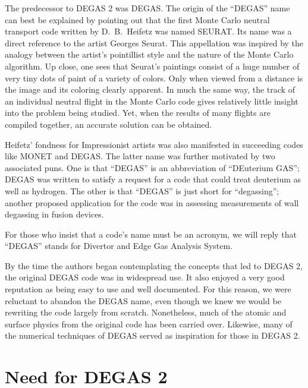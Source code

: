 \documentclass[12pt]{report}
\begin{document}
The predecessor to DEGAS 2 was  DEGAS\cite{Heif82}. The origin of the
``DEGAS'' name can best be explained by pointing out that the first
Monte Carlo neutral transport code written by D.\ B.\ Heifetz was
named SEURAT. Its name was a direct reference to the artist Georges
Seurat. This appellation was inspired by the analogy between the
artist's pointillist style and the nature of the Monte Carlo algorithm.
Up close, one sees that Seurat's paintings consist of a huge number of very
tiny dots of paint of a variety of colors.  Only when viewed from a distance
is the image and its coloring clearly apparent. In much the same way,
the track of an individual neutral flight in the Monte Carlo code
gives relatively little insight into the problem being studied. Yet, when the
results of many flights are compiled together, an accurate solution can
be obtained.

Heifetz' fondness for Impressionist artists was also manifested
in succeeding codes like MONET and DEGAS. The latter name was further
motivated by two associated puns. One is that ``DEGAS'' is an
abbreviation of ``DEuterium GAS''; DEGAS was written to satisfy a
request for a code that could treat deuterium as well as hydrogen.
The other is that ``DEGAS'' is just short for ``degassing''; another
proposed application for the code was in assessing measurements of
wall degassing in fusion devices. 

For those who insist that a code's name must be an acronym, we will
reply that ``DEGAS'' stands for Divertor and Edge Gas Analysis System.

By the time the authors began contemplating the concepts that led
to DEGAS 2, the original DEGAS code was in widespread use. It also
enjoyed a very good reputation as being easy to use and well documented.
For this reason, we were reluctant to abandon the DEGAS name, even
though we knew we would be rewriting the code largely from scratch.
Nonetheless, much of the atomic and surface physics from
the original code has been carried over. Likewise, many of the
numerical techniques of DEGAS served as inspiration for
those in DEGAS 2.

\section{Need for DEGAS 2}
\end{document}

